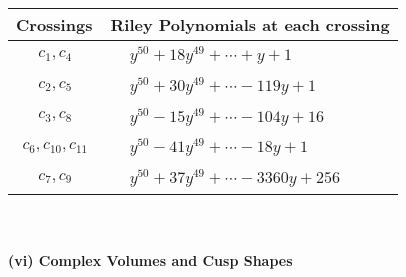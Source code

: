 \documentclass[1p]{elsarticle_modified}
\theoremstyle{definition}
\begin{document}
\begin{tabular}{m{50pt}|m{274pt}}
Crossings & \hspace{64pt}Riley Polynomials at each crossing \\
\hline $$\begin{aligned}c_{1},c_{4}\end{aligned}$$&$\begin{aligned}
&y^{50}+18 y^{49}+\cdots+y+1
\end{aligned}$\\
\hline $$\begin{aligned}c_{2},c_{5}\end{aligned}$$&$\begin{aligned}
&y^{50}+30 y^{49}+\cdots-119 y+1
\end{aligned}$\\
\hline $$\begin{aligned}c_{3},c_{8}\end{aligned}$$&$\begin{aligned}
&y^{50}-15 y^{49}+\cdots-104 y+16
\end{aligned}$\\
\hline $$\begin{aligned}c_{6},c_{10},c_{11}\end{aligned}$$&$\begin{aligned}
&y^{50}-41 y^{49}+\cdots-18 y+1
\end{aligned}$\\
\hline $$\begin{aligned}c_{7},c_{9}\end{aligned}$$&$\begin{aligned}
&y^{50}+37 y^{49}+\cdots-3360 y+256
\end{aligned}$\\
\hline
\end{tabular}\\~\\
\newpage\flushleft \textbf{(vi) Complex Volumes and Cusp Shapes}
\end{document}
